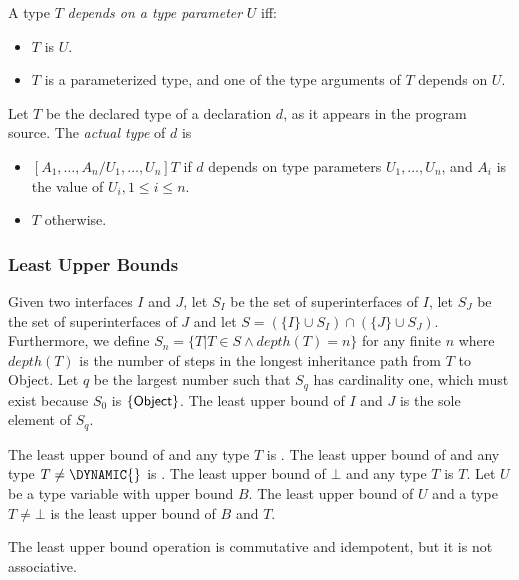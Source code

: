 \documentclass{article}
\newcommand{\code}[1]{{\sf #1}}
\begin{document}
\LMHash{}
A type $T$ {\em depends on a type parameter} $U$ iff:
\begin{itemize}
\item $T$ is $U$.
\item $T$ is a parameterized type, and one of the type arguments of $T$ depends on $U$.
\end{itemize}

\LMHash{}
Let $T$ be the declared type of a declaration $d$, as it appears in the program source. The {\em actual type} of $d$ is

\begin{itemize}
\item  $[A_1, \ldots, A_n/U_1, \ldots, U_n]T$ if $d$ depends on type parameters $U_1, \ldots, U_n$, and $A_i$ is the value of $U_i, 1 \le i \le n$.
\item $T$ otherwise.
\end{itemize}

\subsubsection{Least Upper Bounds}

\LMHash{}
Given two interfaces $I$ and $J$,
let $S_I$ be the set of superinterfaces of $I$,
let $S_J$ be the set of superinterfaces of $J$
and let $S = (\{I\} \cup S_I) \cap (\{J\} \cup S_J)$.
Furthermore,
we define $S_n = \{T | T \in S \wedge depth(T) = n\}$ for any finite $n$
where $depth(T)$ is the number of steps in the longest inheritance path
from $T$ to \code{Object}.
Let $q$ be the largest number such that $S_q$ has cardinality one,
which must exist because $S_0$ is $\{\code{Object}\}$.
The least upper bound of $I$ and $J$ is the sole element of $S_q$.

\LMHash{}
The least upper bound of \DYNAMIC{} and any type $T$ is \DYNAMIC{}.
The least upper bound of \VOID{} and any type $T \ne \DYNAMIC{}$ is \VOID{}.
The least upper bound of $\bot$ and any type $T$ is $T$.
Let $U$ be a type variable with upper bound $B$. The least upper bound of $U$ and a type $T \ne \bot$ is the least upper bound of $B$ and $T$.

\LMHash{}
The least upper bound operation is commutative and idempotent,
but it is not associative.

\end{document}
